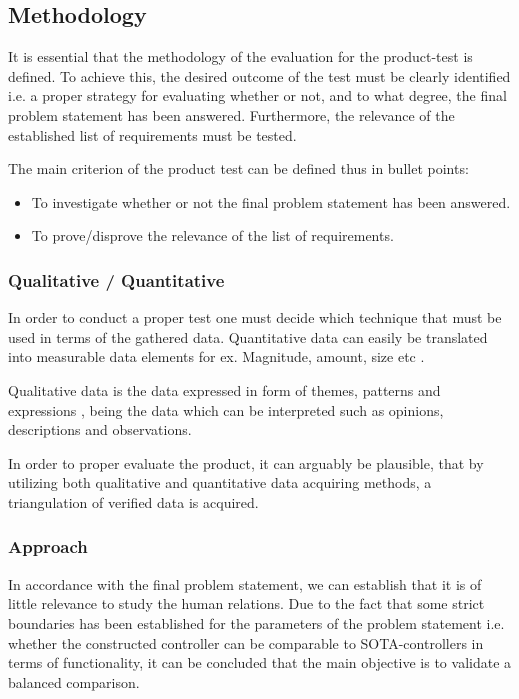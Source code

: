 \subsection{Methodology}
It is essential that the methodology of the evaluation for the product-test is defined. To achieve this, the desired outcome of the test must be clearly identified i.e. a proper strategy for evaluating whether or not, and to what degree, the final problem statement has been answered. Furthermore, the relevance of the established list of requirements must be tested.

The main criterion of the product test can be defined thus in bullet points:
\begin{itemize}
\item To investigate whether or not the final problem statement has been answered.
\item To prove/disprove the relevance of the list of requirements.
\end{itemize}

\subsubsection{Qualitative / Quantitative }
In order to conduct a proper test one must decide which technique that must be used in terms of the gathered data. Quantitative data can easily be translated into measurable data elements for ex. Magnitude, amount, size etc \parencite{Rogers2002}.

Qualitative data is the data expressed in form of themes, patterns and expressions \parencite{Rogers2002}, being the data which can be interpreted such as opinions, descriptions and observations.

In order to proper evaluate the product, it can arguably be plausible, that by utilizing both qualitative and quantitative data acquiring methods, a triangulation of verified data is acquired.

\subsubsection{Approach} \label{sec:approach}
In accordance with the final problem statement, we can establish that it is of little relevance to study the human relations. Due to the fact that some strict boundaries has been established for the parameters of the problem statement i.e. whether the constructed controller can be comparable to SOTA-controllers in terms of functionality, it can be concluded that the main objective is to validate a balanced comparison. 
\bigskip


